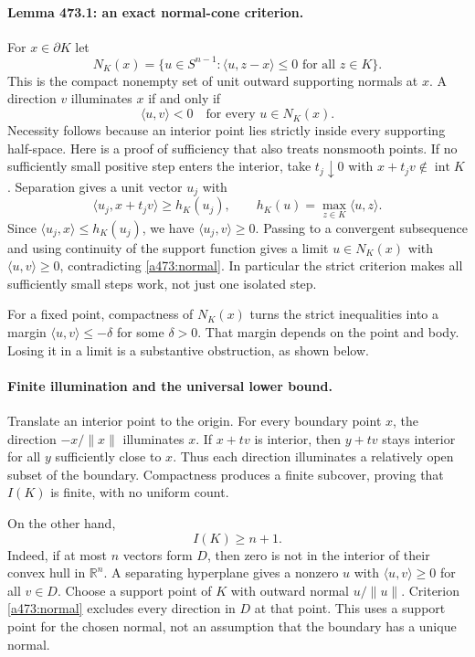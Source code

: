 \documentclass[11pt]{article}
\begin{document}
\paragraph{Lemma 473.1: an exact normal-cone criterion.}
For $x\in\partial K$ let
\[
 N_K(x)=\{u\in S^{n-1}:\langle u,z-x\rangle\leq0\text{ for all }z\in K\}.
\]
This is the compact nonempty set of unit outward supporting normals at $x$. A direction $v$ illuminates $x$ if and only if
\begin{equation}\label{a473:normal}
       \langle u,v\rangle<0\quad\text{for every }u\in N_K(x).
\end{equation}
Necessity follows because an interior point lies strictly inside every supporting half-space. Here is a proof of sufficiency that also treats nonsmooth points. If no sufficiently small positive step enters the interior, take $t_j\downarrow0$ with $x+t_jv\notin\operatorname{int}K$. Separation gives a unit vector $u_j$ with
\[
 \langle u_j,x+t_jv\rangle\geq h_K(u_j),\qquad
 h_K(u)=\max_{z\in K}\langle u,z\rangle.
\]
Since $\langle u_j,x\rangle\leq h_K(u_j)$, we have $\langle u_j,v\rangle\geq0$. Passing to a convergent subsequence and using continuity of the support function gives a limit $u\in N_K(x)$ with $\langle u,v\rangle\geq0$, contradicting \eqref{a473:normal}. In particular the strict criterion makes all sufficiently small steps work, not just one isolated step.

For a fixed point, compactness of $N_K(x)$ turns the strict inequalities into a margin $\langle u,v\rangle\leq-\delta$ for some $\delta>0$. That margin depends on the point and body. Losing it in a limit is a substantive obstruction, as shown below.

\paragraph{Finite illumination and the universal lower bound.}
Translate an interior point to the origin. For every boundary point $x$, the direction $-x/\|x\|$ illuminates $x$. If $x+tv$ is interior, then $y+tv$ stays interior for all $y$ sufficiently close to $x$. Thus each direction illuminates a relatively open subset of the boundary. Compactness produces a finite subcover, proving that $I(K)$ is finite, with no uniform count.

On the other hand,
\begin{equation}\label{a473:lower}
                         I(K)\geq n+1.
\end{equation}
Indeed, if at most $n$ vectors form $D$, then zero is not in the interior of their convex hull in $\mathbb R^n$. A separating hyperplane gives a nonzero $u$ with $\langle u,v\rangle\geq0$ for all $v\in D$. Choose a support point of $K$ with outward normal $u/\|u\|$. Criterion \eqref{a473:normal} excludes every direction in $D$ at that point. This uses a support point for the chosen normal, not an assumption that the boundary has a unique normal.
\end{document}
